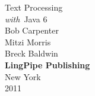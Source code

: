 \cleardoublepage
\pagestyle{empty}
\vspace*{1in}
\begin{center}
{\hfill \fontsize{45}{65}\selectfont Text Processing \\[18pt] \hfill {\fontsize{30}{45}\it with}\ Java 6}
\\[1in]
{\hfill\Huge Bob Carpenter}
\\[12pt]
{\hfill\Huge Mitzi Morris}
\\[12pt]
{\hfill\Huge Breck Baldwin}
\\[-1pt]
\vfill
{\hfill \large\bf LingPipe Publishing}
\\[1pt]
{\hfill \small New York}
\\[-1pt]
{\hfill \small 2011}
\end{center}
